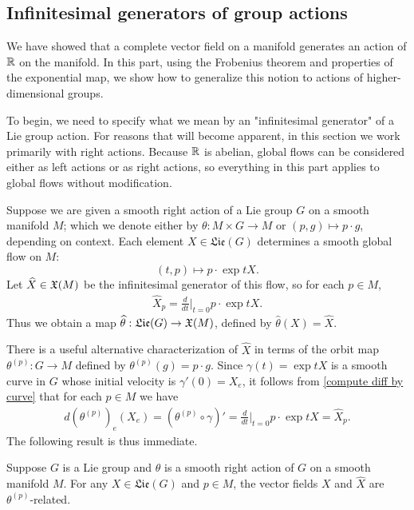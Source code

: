 \subsection{Infinitesimal generators of group actions}
We have showed that a complete vector field on a manifold generates an action of $\mathbb{R}$ on the manifold. In this part, using the Frobenius theorem and properties of the exponential map, we show how to generalize this notion to actions of higher-dimensional groups.\par
To begin, we need to specify what we mean by an "infinitesimal generator" of a Lie group action. For reasons that will become apparent, in this section we work primarily with right actions. Because $\mathbb{R}$ is abelian, global flows can be considered either as left actions or as right actions, so everything in this part applies to global flows without modification.\par
Suppose we are given a smooth right action of a Lie group $G$ on a smooth manifold $M$; which we denote either by $\theta:M\times G\to M$ or $(p,g)\mapsto p\cdot g$, depending on context. Each element $X\in\mathfrak{Lie}(G)$ determines a smooth global flow on $M$:
\[(t,p)\mapsto p\cdot \exp tX.\]
Let $\widehat{X}\in\mathfrak{X}(M)$ be the infinitesimal generator of this flow, so for each $p\in M$,
\begin{align}\label{infinitesimal generator}
\widehat{X}_p=\frac{d}{dt}\Big|_{t=0}p\cdot\exp tX.
\end{align}
Thus we obtain a map $\widehat{\theta}:\mathfrak{Lie}(G)\to\mathfrak{X}(M)$, defined by $\widehat{\theta}(X)=\widehat{X}$.\par
There is a useful alternative characterization of $\widehat{X}$ in terms of the orbit map $\theta^{(p)}:G\to M$ defined by $\theta^{(p)}(g)=p\cdot g$. Since $\gamma(t)=\exp tX$ is a smooth curve in $G$ whose initial velocity is $\gamma'(0)=X_e$, it follows from \cref{compute diff by curve} that for each $p\in M$ we have
\begin{align}\label{infinitesimal generator diff of orbit map}
 d(\theta^{(p)})_e(X_e)=(\theta^{(p)}\circ\gamma)'=\frac{d}{dt}\Big|_{t=0}p\cdot\exp tX=\widehat{X}_p.
\end{align}
The following result is thus immediate.
\begin{proposition}\label{infinitesimal generator is orbit map related}
Suppose $G$ is a Lie group and $\theta$ is a smooth right action of $G$ on a smooth manifold $M$. For any $X\in\mathfrak{Lie}(G)$ and $p\in M$, the vector fields $X$ and $\widehat{X}$ are $\theta^{(p)}$-related.
\end{proposition}
